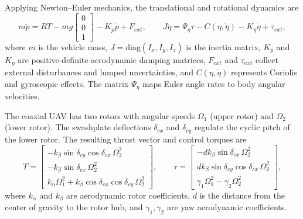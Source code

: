 Applying Newton–Euler mechanics, the translational and rotational dynamics are
\begin{equation}
m\ddot{p} = RT - mg\begin{bmatrix}0\\0\\1\end{bmatrix} - K_p\dot{p} + F_{ext},
\qquad
J\ddot{\eta} = \Psi_\eta\tau - C(\eta,\dot{\eta}) - K_\eta\dot{\eta} + \tau_{ext},
\end{equation}
where $m$ is the vehicle mass, $J = \mathrm{diag}(I_x, I_y, I_z)$ is the inertia
matrix, $K_p$ and $K_\eta$ are positive-definite aerodynamic damping matrices,
$F_{ext}$ and $\tau_{ext}$ collect external disturbances and lumped uncertainties, and
$C(\eta, \dot{\eta})$ represents Coriolis and gyroscopic effects. The matrix
$\Psi_\eta$ maps Euler angle rates to body angular velocities.

The coaxial UAV has two rotors with angular speeds $\Omega_1$ (upper rotor) and
$\Omega_2$ (lower rotor). The swashplate deflections $\delta_{cx}$ and $\delta_{cy}$
regulate the cyclic pitch of the lower rotor. The resulting thrust vector and
control torques are
\begin{equation}
T =
\begin{bmatrix}
-k_\beta \sin\delta_{cy}\cos\delta_{cx}\,\Omega_2^2 \\
-k_\beta \sin\delta_{cx}\,\Omega_2^2 \\
k_\alpha\Omega_1^2 + k_\beta\cos\delta_{cx}\cos\delta_{cy}\,\Omega_2^2
\end{bmatrix},
\qquad
\tau =
\begin{bmatrix}
-dk_\beta\sin\delta_{cx}\,\Omega_2^2 \\
dk_\beta\sin\delta_{cy}\cos\delta_{cx}\,\Omega_2^2 \\
\gamma_1\Omega_1^2 - \gamma_2\Omega_2^2
\end{bmatrix},
\end{equation}
where $k_\alpha$ and $k_\beta$ are aerodynamic rotor coefficients, $d$ is the distance
from the center of gravity to the rotor hub, and $\gamma_1, \gamma_2$ are yaw
aerodynamic coefficients.

